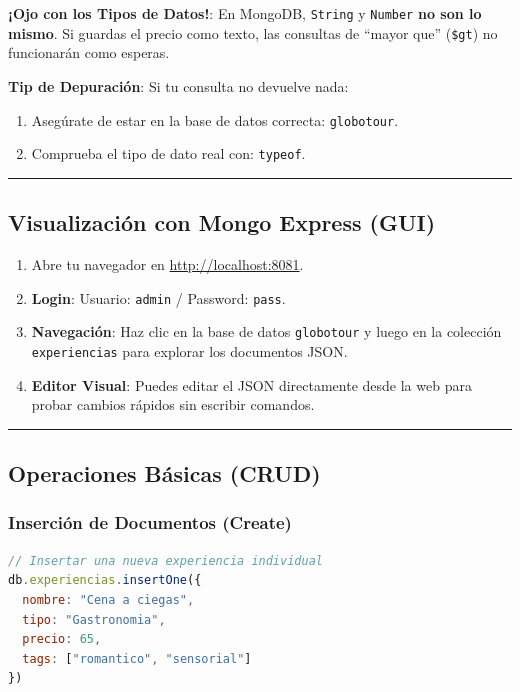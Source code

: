 \documentclass[12pt,a4paper]{article}
\begin{document}
\textbf{¡Ojo con los Tipos de Datos!}: En MongoDB, \texttt{String} y \texttt{Number} \textbf{no son lo mismo}. Si guardas el precio como texto, las consultas de \enquote{mayor que} (\texttt{\$gt}) no funcionarán como esperas.

\textbf{Tip de Depuración}: Si tu consulta no devuelve nada:
\begin{enumerate}
    \item Asegúrate de estar en la base de datos correcta: \texttt{globotour}.
    \item Comprueba el tipo de dato real con: \texttt{typeof}.
\end{enumerate}

\begin{center}\rule{0.5\linewidth}{0.5pt}\end{center}

\subsection{Visualización con Mongo Express (GUI)}

\begin{enumerate}
    \item Abre tu navegador en \url{http://localhost:8081}.
    \item \textbf{Login}: Usuario: \texttt{admin} / Password: \texttt{pass}.
    \item \textbf{Navegación}: Haz clic en la base de datos \texttt{globotour} y luego en la colección \texttt{experiencias} para explorar los documentos JSON.
    \item \textbf{Editor Visual}: Puedes editar el JSON directamente desde la web para probar cambios rápidos sin escribir comandos.
\end{enumerate}

\begin{center}\rule{0.5\linewidth}{0.5pt}\end{center}

\subsection{Operaciones Básicas (CRUD)}\label{mql}



\subsubsection{Inserción de Documentos (Create)}
\begin{lstlisting}[language=JavaScript]
// Insertar una nueva experiencia individual
db.experiencias.insertOne({
  nombre: "Cena a ciegas",
  tipo: "Gastronomia",
  precio: 65,
  tags: ["romantico", "sensorial"]
})
\end{lstlisting}
\end{document}
